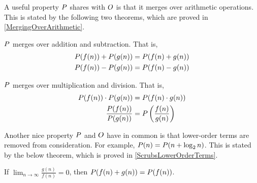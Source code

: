 A useful property $P$ shares with $O$ is that it merges over arithmetic operations. This is stated by the following two theorems, which are proved in \ref{MergingOverArithmetic}.

\begin{theorem}
	$P$ merges over addition and subtraction. That is,
	\begin{align*}
	P(f(n)) + P(g(n)) &= P(f(n) + g(n))\\
	P(f(n)) - P(g(n)) &= P(f(n) - g(n))
	\end{align*}
\end{theorem}

\begin{theorem}
	$P$ merges over multiplication and division. That is,
	\begin{align*}
	P(f(n)) \cdot P(g(n)) &= P(f(n) \cdot g(n))\\
	\frac {P(f(n))} {P(g(n))} &= P\left(\frac{f(n)} {g(n)}\right)
	\end{align*}
\end{theorem}

Another nice property $P$ and $O$ have in common is that lower-order terms are removed from consideration. For example, $P(n) = P(n + \log_2 n)$. This is stated by the below theorem, which is proved in \ref{ScrubsLowerOrderTerms}.

\begin{theorem}
	If $\lim_{n \to \infty} \frac{g(n)}{f(n)} = 0$, then $P(f(n) + g(n)) = P(f(n))$.
\end{theorem}